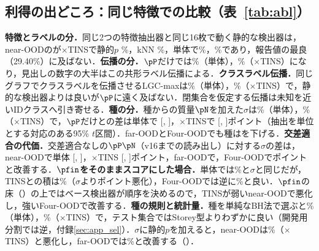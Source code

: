 \subsection{利得の出どころ：同じ特徴での比較（表~\ref{tab:abl}）}
\label{sec:abl}
\textbf{特徴とラベルの分．}同じ2つの特徴抽出器と同じ16枚で動く静的な検出器は，near-OODの\FPR{}が$\times$TINSで静的$p$ \NAblXfitStaticPooledTinsNearFpr\%，kNN \NAblKnnTinsNearFpr\%，単体で\NAblXfitStaticPooledNoneNearFpr\%，\NAblKnnNoneNearFpr\%であり，報告値の最良（29.40\%）に及ばない．\textbf{伝播の分．}$\pP$だけで\FPR{}は\NAblXfitLpPooledNoneNearFpr\%（単体），\NAblXfitLpPooledTinsNearFpr\%（$\times$TINS）になり，見出しの数字の大半はこの共形ラベル伝播による．\textbf{クラスラベル伝播．}同じグラフでクラスラベルを伝播させるLGC-maxは\NAblLgcmaxNoneNearFpr\%（単体），\NAblLgcmaxTinsNearFpr\%（$\times$TINS）で，静的な検出器よりは良いが$\pP$に遠く及ばない．閉集合を仮定する伝播は未知を近いIDクラスへ引き寄せる．\textbf{種の分．}種からの質量$\pN$を加えた$\sigma$は\NAloneNearFpr\%（単体），\NNearFpr\%（$\times$TINS）で，$\pP$だけとの差は単体で\NAloneNearDfprVsLp{} [\NAloneNearDfprVsLpLo, \NAloneNearDfprVsLpHi]，$\times$TINSで\NNearDfprVsLp{} [\NNearDfprVsLpLo, \NNearDfprVsLpHi]ポイント（抽出を単位とする対応のある95\% $t$区間）．far-OODとFour-OODでも種は\FPR{}を下げる．\textbf{交差適合の代価．}交差適合なしの$\pP\pN$（v16までの読み出し）に対する$\sigma$の差は，near-OODで単体\NAloneNearDfprVsVOne{} [\NAloneNearDfprVsVOneLo, \NAloneNearDfprVsVOneHi]，$\times$TINS \NNearDfprVsVOne{} [\NNearDfprVsVOneLo, \NNearDfprVsVOneHi]ポイント，far-OODで\NFarDfprVsVOne{}，Four-OODで\NFourDfprVsVOne{}ポイントと改善する．\textbf{$\pfin$をそのままスコアにした場合．}単体では\NPfAloneNearFpr\%と$\sigma$と同じだが，TINSとの積は\NPfNearFpr\%（$\sigma$より\NPfNearDfprVsAlone{}ポイント悪化），Four-OODでは逆に\NPfFourFpr\%と良い．$\pfin$の床（）の上ではベース検出器が順序を決めるので，TINSが弱いnear-OODで悪化し，強いFour-OODで改善する．\textbf{種の規則と統計量．}種を単純なBH法で選ぶと\NAblXfitBhQZeroTwoPpPooledNoneNearFpr\%（単体），\NAblXfitBhQZeroTwoPpPooledTinsNearFpr\%（$\times$TINS）で，テスト集合ではStorey型よりわずかに良い（開発用分割では逆，付録\ref{sec:app_sel}）．$\sigma$に静的$p$を加えると，near-OODは\NAblXfitStoreyQZeroTwoPpsPooledTinsNearFpr\%（$\times$TINS）と悪化し，far-OODでは\NAblXfitStoreyQZeroTwoPpsPooledTinsFarFpr\%と改善する（）．

\begin{table}[t]
\caption{同じ特徴での読み出しの比較（[\%]，$\times$TINS；単体は付録\ref{sec:app_sens}の）．静的$p$とkNNはグラフを使わない検出器，LGC-maxは同じグラフ上のクラスラベル伝播（いずれも較正順位で読む）．$\pP$は支持画像からの伝播，$\pN$は種からの伝播，$\sigma$は交差適合した統計量，$\pfin$はその較正順位（）．到着時採点は付録\ref{sec:app_online}のモード（抽出は1通り）．\textcolor{sotacol}{$\bigstar$}は列の最良値．}
\label{tab:abl}
\centering
\vspace{0.5mm}

\end{table}

